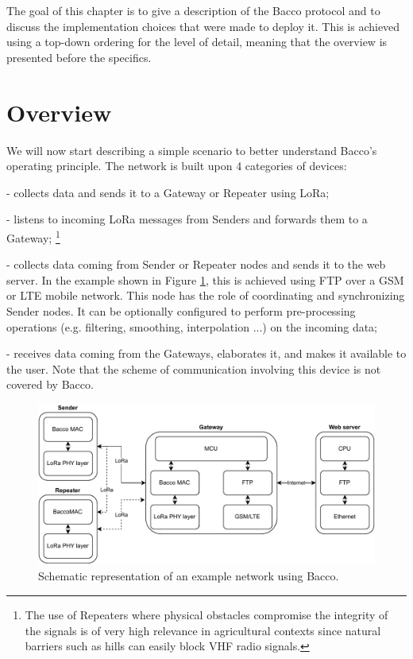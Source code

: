 The goal of this chapter is to give a description of the Bacco protocol and to discuss the
implementation choices that were made to deploy it. This is achieved using a top-down ordering for the level
of detail, meaning that the overview is presented before the specifics.

\section{Overview}
We will now start describing a simple scenario to better understand Bacco's operating principle. The network is
built upon 4 categories of devices:

\begin{description}[font=$\bullet$~\normalfont\scshape\color{blue!50!black}]
    \item [Sender node] - collects data and sends it to a Gateway or Repeater using LoRa;
    \item [Repeater node] - listens to incoming LoRa messages from Senders and forwards them to a Gateway; \footnote{The
            use of Repeaters where physical obstacles compromise the integrity of the signals is of very high relevance in
        agricultural contexts since natural barriers such as hills can easily block \gls{VHF} radio signals.}
    \item [Gateway node] - collects data coming from Sender or Repeater nodes and sends it to the web server. In the example
        shown in Figure \ref{img: network stack}, this is achieved using \gls{FTP} over a \gls{GSM} or \gls{LTE} mobile
        network. This node has the role of coordinating and synchronizing Sender nodes. It can be optionally configured
        to perform pre-processing operations (e.g. filtering, smoothing, interpolation ...) on the incoming data;
    \item [Web server] - receives data coming from the Gateways, elaborates it, and makes it available to the user. Note
        that the scheme of communication involving this device is not covered by Bacco.
\end{description}

\begin{figure}[ht]
    \centering
    \includegraphics[width=1.0\textwidth]{uml/network_stack.pdf}
    \caption{Schematic representation of an example network using Bacco.}
    \label{img: network stack}
\end{figure}

